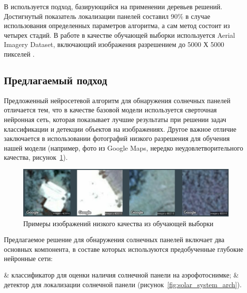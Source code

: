 В \cite[c.~4-5]{malof2016} используется подход, базирующийся на применении деревьев решений. Достигнутый показатель локализации панелей составил 90\% в случае использования определенных параметров алгоритма, а сам метод состоит из четырех стадий. В работе в качестве обучающей выборки используется Aerial Imagery Dataset, включающий изображения разрешением до 5000 Х 5000 пикселей \cite[c.~6]{bradbury2016}.

\subsection{Предлагаемый подход}

Предложенный нейросетевой алгоритм для обнаружения солнечных панелей отличается тем, что в качестве базовой модели используется сверточная нейронная сеть, которая показывает лучшие результаты при решении задач классификации и детекции объектов на изображениях. Другое важное отличие заключается в использовании фотографий низкого разрешения для обучения нашей модели (например, фото из Google Maps, нередко неудовлетворительного качества, рисунок~\ref{fig:example_of_images}). 

\begin{figure}[ht]
	\centering
	\includegraphics[width=16cm]{man-source/images/ch4/pic4-16.png}
	\caption{Примеры изображений низкого качества из обучающей выборки}
	\label{fig:example_of_images}
\end{figure}

Предлагаемое решение для обнаружения солнечных панелей включает два основных компонента, в составе которых используются предобученные глубокие нейронные сети: 

\begin{easylistNum}
    & классификатор для оценки наличия солнечной панели на аэрофотоснимке;
    & детектор для локализации солнечной панели (рисунок~\ref{fig:solar_system_arch}).
\end{easylistNum}


